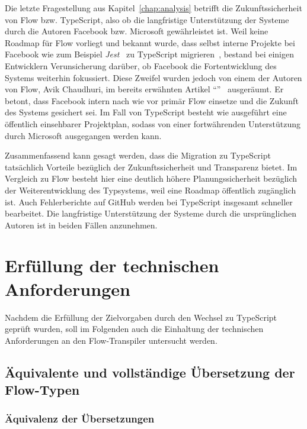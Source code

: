Die letzte Fragestellung aus Kapitel~\ref{chap:analysis} betrifft die Zukunftssicherheit von Flow bzw. TypeScript, also ob die langfristige Unterstützung der Systeme durch die Autoren Facebook bzw. Microsoft gewährleistet ist. Weil keine Roadmap für Flow vorliegt und bekannt wurde, dass selbst interne Projekte bei Facebook wie zum Beispiel \textit{Jest}~\autocite{SOFTWARE:JEST} zu TypeScript migrieren~\autocite{JEST_TS}, bestand bei einigen Entwicklern Verunsicherung darüber, ob Facebook die Fortentwicklung des Systems weiterhin fokussiert. Diese Zweifel wurden jedoch von einem der Autoren von Flow, Avik Chaudhuri, im bereits erwähnten Artikel \enquote{}~\autocite{FLOW:UPDATE_2019} ausgeräumt. Er betont, dass Facebook intern nach wie vor primär Flow einsetze und die Zukunft des Systems gesichert sei. Im Fall von TypeScript besteht wie ausgeführt eine öffentlich einsehbarer Projektplan, sodass von einer fortwährenden Unterstützung durch Microsoft ausgegangen werden kann.

Zusammenfassend kann gesagt werden, dass die Migration zu TypeScript tatsächlich Vorteile bezüglich der Zukunftssicherheit und Transparenz bietet. Im Vergleich zu Flow besteht hier eine deutlich höhere Planungssicherheit bezüglich der Weiterentwicklung des Typsystems, weil eine Roadmap öffentlich zugänglich ist. Auch Fehlerberichte auf GitHub werden bei TypeScript insgesamt schneller bearbeitet. Die langfristige Unterstützung der Systeme durch die ursprünglichen Autoren ist in beiden Fällen anzunehmen.

\section{Erfüllung der technischen Anforderungen}

Nachdem die Erfüllung der Zielvorgaben durch den Wechsel zu TypeScript geprüft wurden, soll im Folgenden auch die Einhaltung der technischen Anforderungen an den Flow-Transpiler untersucht werden.

\subsection{Äquivalente und vollständige Übersetzung der Flow-Typen}
\label{sec:interpretation:equivalent-translation}

\subsubsection{Äquivalenz der Übersetzungen}

